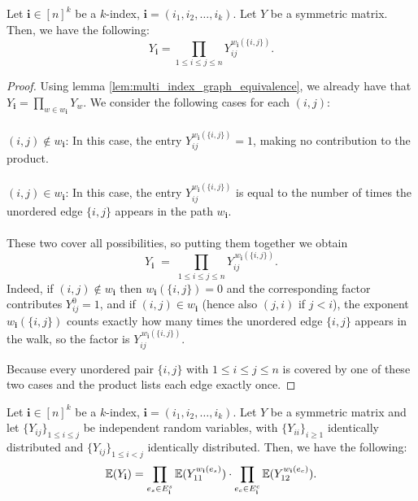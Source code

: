 \begin{lemma}
    \label{lem:graph_walk_count_equivalence}
    Let $\mathbf{i} \in[n]^k$ be a $k$-index, $\mathbf{i}=\left(i_1, i_2, \ldots, i_k\right)$.
    Let $Y$ be a symmetric matrix. Then, we have the following:
    $$
    Y_{\mathbf{i}} =  \prod_{1 \leq i \leq j \leq n} Y_{ij}^{w_{\mathbf{i}}(\{i, j\})}.
    $$
\end{lemma}

\begin{proof}
  Using lemma \ref{lem:multi_index_graph_equivalence}, we already have that $Y_{\mathbf{i}} = \prod_{w \in w_{\mathbf{i}}} Y_{w}$. We consider the following cases for each $(i, j)$:\\\\
  \textbf{$(i, j) \notin w_{\mathbf{i}}$}: In this case, the entry $Y_{ij}^{w_{\mathbf{i}}(\{i, j\})} = 1$, making no contribution to the product. \\\\
  \textbf{$(i, j) \in w_{\mathbf{i}}$}: In this case, the entry $Y_{ij}^{w_{\mathbf{i}}(\{i, j\})}$ is equal to the number of times the unordered edge $\{i, j\}$ appears in the path $w_{\mathbf{i}}$. \\\\
  These two cover all possibilities, so putting them together we obtain
  $$
  Y_{\mathbf i}
        \;=\;
        \prod_{1\le i\le j\le n}
            Y_{ij}^{\,w_{\mathbf i}(\{i,j\})}.
  $$
  Indeed, if $(i,j)\notin w_{\mathbf i}$ then $w_{\mathbf i}(\{i,j\})=0$ and the corresponding factor contributes $Y_{ij}^{0}=1$, and if $(i,j)\in w_{\mathbf i}$ (hence also $(j,i)$ if $j<i$), the exponent $w_{\mathbf i}(\{i,j\})$ counts exactly how many times the unordered edge $\{i,j\}$ appears in the walk, so the factor is $Y_{ij}^{\,w_{\mathbf i}(\{i,j\})}$.

  Because every unordered pair $\{i,j\}$ with $1\le i\le j\le n$ is covered by one of these two cases and the product lists each edge exactly once.
\end{proof}

\begin{lemma}
    \label{lem:expectation_matrix_multi_index}
    Let $\mathbf{i} \in[n]^k$ be a $k$-index, $\mathbf{i}=\left(i_1, i_2, \ldots, i_k\right)$. Let $Y$ be a symmetric matrix and let $\{Y_{ij}\}_{1\le i\le j}$ be independent random variables, with $\{Y_{ii}\}_{i\ge 1}$ identically distributed and $\{Y_{ij}\}_{1\le i<j}$ identically distributed. Then, we have the following:
    $$
    \mathbb{E}(Y_{\mathbf{i}}) = \prod_{e_s \in E_{\mathbf{i}}^s} \mathbb{E}(Y_{11}^{w_{\mathbf{i}}(e_s)}) \cdot \prod_{e_c \in E_{\mathbf{i}}^c} \mathbb{E}(Y_{12}^{w_{\mathbf{i}}(e_c)}).
    $$
\end{lemma}

